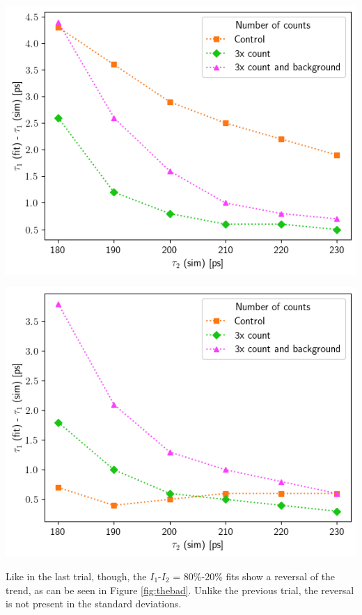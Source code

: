  
\begin{minipage}{0.47\linewidth}
    \includegraphics[width=\linewidth]{Batch 5/t1-diff 5050.png}
    \label{fig:thegood}
\end{minipage}
\begin{minipage}{0.47\linewidth}
    \includegraphics[width=\linewidth]{Batch 5/t1-diff 8020.png}
    \label{fig:thebad}
\end{minipage}
 

Like in the last trial, though, the $I_1$-$I_2$ = 80\%-20\% fits show a reversal of the trend, as can be seen in Figure \ref{fig:thebad}. Unlike the previous trial, the reversal is not present in the standard deviations.


